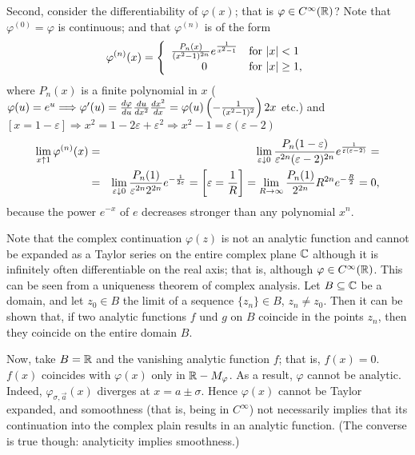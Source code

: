 {Second, consider the differentiability of $\varphi (x)$;
that is $\varphi\in C^\infty({\Bbb R})$?
Note that
$\varphi^{(0)}=\varphi$ is continuous;
and that $\varphi^{(n)}$ is of the form
$$
   \varphi^{(n)}(x)=\left\{\begin{array}{cl}
                         {P_n(x)\over(x^2-1)^{2n}}    e^{1\over x^2-1}&\mbox{for $|x|<1$}\\
                         0&\mbox{for $|x|\geq1$,}
                    \end{array}\right.
$$
where $P_n(x)$ is a finite polynomial in $x$
 ($\varphi(u)=e^u\Longrightarrow
\varphi'(u)={d\varphi\over du}{du\over dx^2}{dx^2\over dx}=\varphi(u)
\left(-{1\over(x^2-1)^2}\right)2x$ etc.) and $[x=1-\varepsilon]\Longrightarrow
x^2=1-2\varepsilon+\varepsilon^2\Longrightarrow x^2-1=
\varepsilon(\varepsilon-2)$
\begin{eqnarray*}
   \lim_{x\uparrow1}\varphi^{(n)}(x)&=&\lim_{\varepsilon\downarrow0}
      {P_n(1-\varepsilon)\over\varepsilon^{2n}(\varepsilon-2)^{2n}}
      e^{1\over\varepsilon(\varepsilon-2)}=\\
   &=&\lim_{\varepsilon\downarrow0}{P_n(1)\over\varepsilon^{2n}2^{2n}}
      e^{-{1\over2\varepsilon}}=\left[\varepsilon={1\over R}\right]=
      \lim_{R\to\infty}{P_n(1)\over2^{2n}}R^{2n}e^{-{R\over2}}=0,
\end{eqnarray*}
because the power $e^{-x}$ of $e$
decreases stronger
than any polynomial  $x^n$.

Note that the complex continuation
$\varphi (z)$ is not an analytic function and cannot be expanded as a Taylor series on the
entire complex plane ${\Bbb C}$ although it is infinitely often
differentiable on the real axis; that is, although
$\varphi\in C^\infty({\Bbb R})$.
This can be seen from a uniqueness theorem of complex analysis.
Let
 $B\subseteq{\Bbb C}$ be a domain, and
let
$z_0\in B$ the limit of a sequence
$\{z_n\}\in B$, $z_n\ne z_0$.
Then it can be shown that, if two
analytic functions
$f$ und $g$ on $B$  coincide in the points $z_n$,
then they coincide on the entire domain $B$.

Now, take  $B={\Bbb R}$ and
the  vanishing analytic function $f$; that is,
$f(x)=0$.
$f(x)$ coincides with $\varphi (x)$ only in
 ${\Bbb R} - M_\varphi$.
As a result, $\varphi$ cannot be analytic.
Indeed, $\varphi_{\sigma,\vec a}(x)$  diverges at $x=a\pm\sigma$.
Hence $\varphi(x)$ cannot be Taylor expanded, and somoothness (that is, being in  $C^\infty$)
not necessarily implies that its continuation into the complex plain results in an analytic function. (The converse is true though: analyticity implies smoothness.)
\eproof
}

